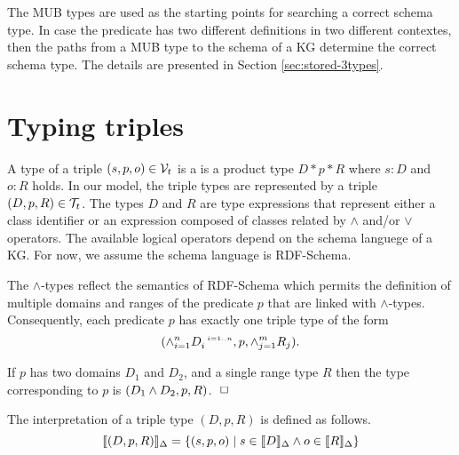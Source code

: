 \documentclass[runningheads]{llncs}
\newcommand{\s}{\scriptscriptstyle\ \,}
\newcommand{\llb}{\llbracket}
\newcommand{\rrb}{\rrbracket}
\newcommand{\V}{{\cal V}}
\newcommand{\T}{{\cal T}}
\newcommand{\finbox}{\phantom{.}\hfill\Box}
\newcommand{\memo}[1]{}
\begin{document}
\memo{
The individual MUB types derived by the above rule are gathered
into one $\land$ type of MUB types by using the following rule.

\begin{equation}
\label{rul:join-gather}
\dfrac{I\in\V_i\quad\/S_i^{\s\/i=1..m}\in\T_i\quad\forall\/i=1..m,\, I:_\sqcup\/S_i}
{I:_{\sqcup}\land_{i=1}^m\/S_i}
\end{equation}}

The MUB types are used as the starting points for searching a correct
schema type. In case the predicate has two different definitions in
two different contextes, then the paths from a MUB type to the schema
of a KG determine the correct schema type. The details are presented
in Section \ref{sec:stored-3types}.






\section{Typing triples\label{sec:triples}}



A type of a triple $(s,p,o)\in\V_t$ is a is a product type $D*p*R$
where $s:D$ and $o:R$ holds. In our model, the triple types are
represented by a triple $(D,p,R)\in\T_t$. The types $D$ and $R$ are
type expressions that represent either a class identifier or an 
expression composed of classes related by $\land$ and/or $\lor$
operators. The available logical operators depend on the schema
languege of a KG. For now, we assume the schema language is
RDF-Schema.

The $\land$-types reflect the semantics of RDF-Schema \cite{rdfschema}
which permits the definition of multiple domains and ranges of the
predicate $p$ that are linked with $\land$-types. Consequently, each
predicate $p$ has exactly one triple type of the form
$$(\land_{i=1}^n\/D_i^{\s\/i=1..n},p,\land_{j=1}^m\/R_j).$$

\begin{example}
  If $p$ has two domains $D_1$ and $D_2$, and a single
range type $R$ then the type corresponding to $p$ is
$(D_1\land\/D_2,p,R)$. $\finbox$
\end{example}

\noindent
The interpretation of a triple type $(D,p,R)$ is defined as
follows.
$$\llb(D,p,R)\rrb_\Delta=\{(s,p,o)\mid\/s\in\llb\/D\rrb_\Delta\land\/o\in\llb\/R\rrb_\Delta \}$$
\end{document}
